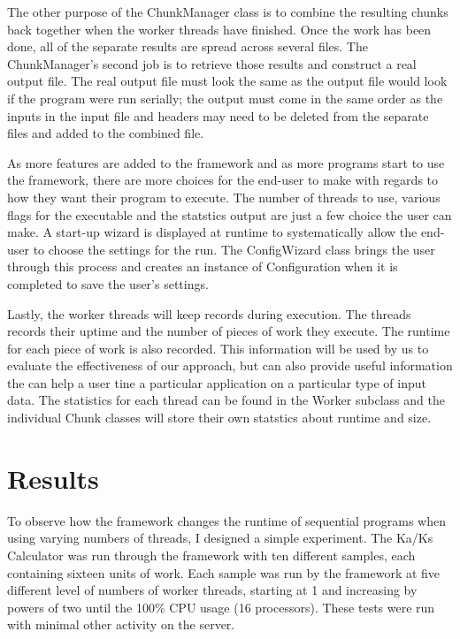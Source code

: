 \documentclass[12pt]{article}
\begin{document}
The other purpose of the ChunkManager class is to combine the resulting chunks 
back together when the worker threads have finished. Once the work has been
done, all of the separate results are spread across several files. The
ChunkManager's second job is to retrieve those results and construct a real
output file. The real output file must look the same as the output file would
look if the program were run serially; the output must come in the same order as
the inputs in the input file and headers may need to be deleted from the
separate files and added to the combined file.

As more features are added to the framework and as more programs start to use 
the framework, there are more choices for the end-user to make with regards to 
how they want their program to execute. The number of threads to use, various 
flags for the executable and the statstics output are just a few choice the 
user can make. A start-up wizard is displayed at runtime to systematically allow
the end-user to choose the settings for the run. The ConfigWizard class brings 
the user through this process and creates an instance of Configuration when it 
is completed to save the user's settings.

Lastly, the worker threads will keep records during execution. The threads 
records their uptime and the number of pieces of work they execute. The runtime 
for each piece of work is also recorded. This information will be used by us to
evaluate the effectiveness of our approach, but can also provide useful
information the can help a user tine a particular application on a particular
type of input data. The statistics for each thread can be found in the Worker 
subclass and the individual Chunk classes will store their own statstics about 
runtime and size.

\section{Results}

To observe how the framework changes the runtime of sequential programs when
using varying numbers of threads, I designed a simple experiment. The Ka/Ks 
Calculator was run through the framework with ten different samples, each 
containing sixteen units of work. Each sample was run by the framework at five 
different level of numbers of worker threads, starting at 1 and increasing by 
powers of two until the 100\% CPU usage (16 processors). These tests were run
with minimal other activity on the server.
\end{document}
